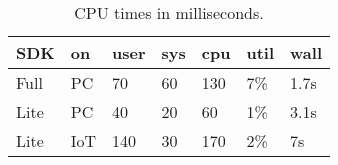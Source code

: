 \begin{table}[H]
    \centering
    \begin{tabular}{||lllllll||}
    \hline
         SDK & on & user & sys & cpu & util & wall  \\
         \hline \hline
         Full & PC &70 & 60 & 130 & 7\% & 1.7s  \\
         \hline
         Lite & PC &40& 20 & 60 & 1\% & 3.1s\\
         \hline
         Lite & IoT &140& 30  & 170 & 2\% & 7s\\
         \hline
    \end{tabular}
    \caption{CPU times in milliseconds.}
    \label{tab:CPU}
\end{table}